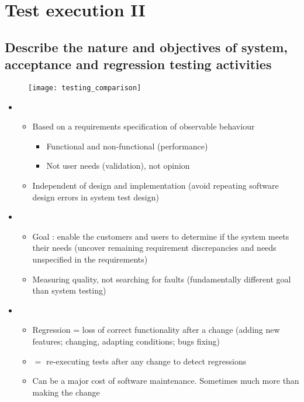 \chapter{Test execution II}

\section{Describe the nature and objectives of system, acceptance and regression testing activities}

\begin{figure}[H]
    \centering
    \texttt{[image: testing\_comparison]}
\end{figure}

\begin{itemize}
    \item {}
    \begin{itemize}
        \item Based	on a requirements specification of observable behaviour
        \begin{itemize}
            \item Functional and non-functional (performance)
            \item Not user needs (validation), not opinion
        \end{itemize}
        \item Independent of design	and	implementation (avoid repeating software design errors	 in system test design)
    \end{itemize}
    \item {}
    \begin{itemize}
        \item Goal : enable the customers and users to determine if the system meets their needs (uncover remaining requirement discrepancies and needs unspecified in the requirements)
        \item Measuring	quality, not searching for faults (fundamentally different goal than system testing)
    \end{itemize}
    \item {}
    \begin{itemize}
        \item Regression = loss of correct functionality after a change (adding new features; changing, adapting conditions; bugs fixing)
        \item {} $=$ re‐executing tests after any change to detect regressions
        \item Can be a major cost of software maintenance. Sometimes much more than making the change
    \end{itemize}
\end{itemize}

